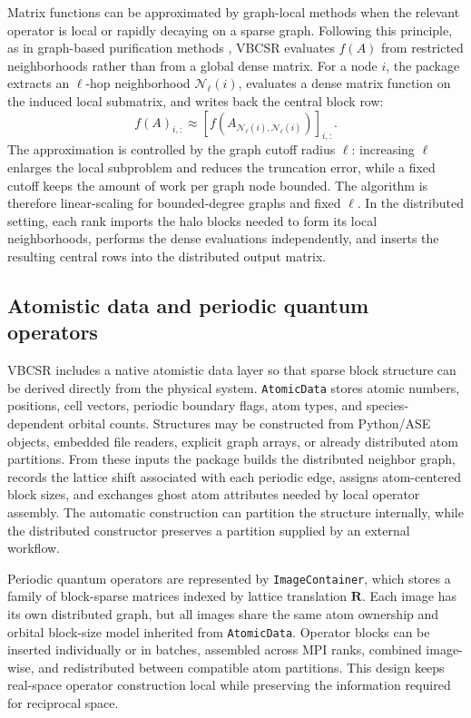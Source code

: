 \documentclass[
reprint,
superscriptaddress,
frontmatterverbose,
amsmath,amssymb,
pra,
]{revtex4-2}
\begin{document}
Matrix functions can be approximated by graph-local methods when the relevant
operator is local or rapidly decaying on a sparse graph.  Following this
principle, as in graph-based purification methods \cite{niklasson2016graph},
VBCSR evaluates $f(A)$ from restricted neighborhoods rather than from a global
dense matrix.  For a node $i$, the package extracts an $\ell$-hop neighborhood
$\mathcal{N}_{\ell}(i)$, evaluates a dense matrix function on the induced local
submatrix, and writes back the central block row:
\begin{equation}
    f(A)_{i,:} \approx
    \left[
    f\left(A_{\mathcal{N}_{\ell}(i),\mathcal{N}_{\ell}(i)}\right)
    \right]_{i,:}.
    \label{eq:local_function}
\end{equation}
The approximation is controlled by the graph cutoff radius $\ell$: increasing
$\ell$ enlarges the local subproblem and reduces the truncation error, while a
fixed cutoff keeps the amount of work per graph node bounded.  The algorithm is
therefore linear-scaling for bounded-degree graphs and fixed $\ell$.  In the
distributed setting, each rank imports the halo blocks needed to form its local
neighborhoods, performs the dense evaluations independently, and inserts the
resulting central rows into the distributed output matrix.

\subsection{Atomistic data and periodic quantum operators}

VBCSR includes a native atomistic data layer so that sparse block structure can
be derived directly from the physical system.  \texttt{AtomicData} stores
atomic numbers, positions, cell vectors, periodic boundary flags, atom types,
and species-dependent orbital counts.  Structures may be constructed from
Python/ASE objects, embedded file readers, explicit graph arrays, or already
distributed atom partitions.  From these inputs the package builds the
distributed neighbor graph, records the lattice shift associated with each
periodic edge, assigns atom-centered block sizes, and exchanges ghost atom
attributes needed by local operator assembly.  The automatic construction can
partition the structure internally, while the distributed constructor preserves
a partition supplied by an external workflow.

Periodic quantum operators are represented by \texttt{ImageContainer}, which
stores a family of block-sparse matrices indexed by lattice translation
$\mathbf{R}$.  Each image has its own distributed graph, but all images share
the same atom ownership and orbital block-size model inherited from
\texttt{AtomicData}.  Operator blocks can be inserted individually or in
batches, assembled across MPI ranks, combined image-wise, and redistributed
between compatible atom partitions.  This design keeps real-space operator
construction local while preserving the information required for reciprocal
space.
\end{document}
